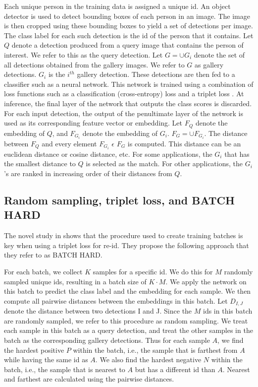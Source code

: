\documentclass{article}
\begin{document}
Each unique person in the training data is assigned a unique id. An object detector is used to detect bounding boxes of each person in an image. The image is then cropped using these bounding boxes to yield a set of detections per image. The class label for each such detection is the id of the person that it contains. Let $Q$ denote a detection produced from a query image that contains the person of interest. We refer to this as the query detection. Let $G = \cup G_i$ denote the set of all detections obtained from the gallery images. We refer to $G$ as gallery detections. $G_i$ is the $i^{th}$ gallery detection. These detections are then fed to a classifier such as a neural network. This network is trained using a combination of loss functions such as a classification (cross-entropy) loss and a triplet loss \cite{hermans2017defense}. At inference, the final layer of the network that outputs the class scores is discarded. For each input detection, the output of the penultimate layer of the network is used as its corresponding feature vector or embedding.  Let $F_Q$ denote the embedding of $Q$, and $F_{G_i}$ denote the embedding of $G_i$. $F_G = \cup F_{G_i} $. The distance between $F_Q$ and every element $F_{G_i}$ $\epsilon$ $F_G$ is computed. This distance can be an euclidean distance or cosine distance, etc. For some applications, the $G_i$ that has the smallest distance to $Q$ is selected as the match. For other applications, the $G_i$'s are ranked in increasing order of their distances from $Q$. 

\subsection{Random sampling, triplet loss, and BATCH HARD}
\label{sec:triplet_batchhard}
The novel study in \cite{hermans2017defense} shows that the procedure used to create training batches is key when using a triplet loss for re-id. They propose the following approach that they refer to as BATCH HARD. 

For each batch, we collect $K$ samples for a specific id. We do this for $M$ randomly sampled unique ids, resulting in a batch size of $K \cdot M$. We apply the network on this batch to predict the class label and the embedding for each sample. We then compute all pairwise distances between the embeddings in this batch. Let $D_{I,J}$ denote the distance between two detections I and J. Since the $M$ ids in this batch are randomly sampled, we refer to this procedure as random sampling. We treat each sample in this batch as a query detection, and treat the other samples in the batch as the corresponding gallery detections. Thus for each sample $A$, we find the hardest positive $P$ within the batch, i.e., the sample that is farthest from $A$ while having the same id as $A$. We also find the hardest negative $N$ within the batch, i.e., the sample that is nearest to $A$ but has a different id than $A$. Nearest and farthest are calculated using the pairwise distances. 
\end{document}
